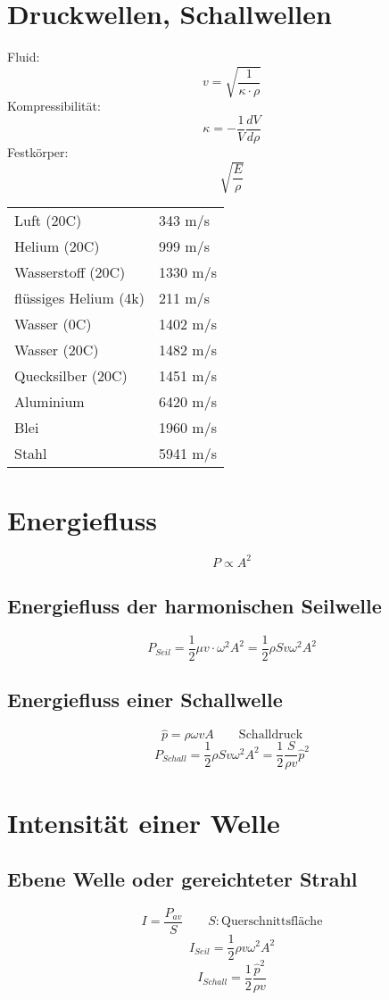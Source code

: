 \section{Druckwellen, Schallwellen}
Fluid: 
\[ \boxed{v = \sqrt{\frac{1}{\kappa \cdot \rho}}} \]
Kompressibilität: 
\[ \boxed{\kappa = -\frac{1}{V} \frac{d V}{d \rho}} \]
Festkörper: 
\[ \boxed{\sqrt{\frac{E}{\rho}}} \]
\begin{tabular}{ll}
Luft (20C) & 343 m/s \\
Helium (20C) & 999 m/s \\
Wasserstoff (20C) & 1330 m/s \\
flüssiges Helium (4k) & 211 m/s \\
Wasser (0C) & 1402 m/s \\
Wasser (20C) & 1482 m/s \\
Quecksilber (20C) & 1451 m/s \\
Aluminium & 6420 m/s \\
Blei & 1960 m/s \\
Stahl & 5941 m/s \\
\end{tabular}

\section{Energiefluss}
\[ \boxed{P \propto A^2} \]
\subsection{Energiefluss der harmonischen Seilwelle}
\[ \boxed{P_{Seil} = \frac{1}{2} \mu v \cdot \omega^2 A^2 
= \frac{1}{2} \rho S v \omega^2 A^2} \]
\subsection{Energiefluss einer Schallwelle}
\[ \boxed{\hat{p} = \rho \omega v A} \qquad \text{Schalldruck} \]
\[ \boxed{P_{Schall} = \frac{1}{2} \rho S v \omega^2 A^2 
= \frac{1}{2} \frac{S}{\rho v} \hat{p}^2} \]

\section{Intensität einer Welle}
\subsection{Ebene Welle oder gereichteter Strahl}
\[ \boxed{I = \frac{P_{av}}{S}} \qquad S: \text{Querschnittsfläche}\]
\[ \boxed{I_{Seil} = \frac{1}{2} \rho v \omega^2 A^2} \]
\[ \boxed{I_{Schall} = \frac{1}{2} \frac{\hat{p}^2}{\rho v}} \]
